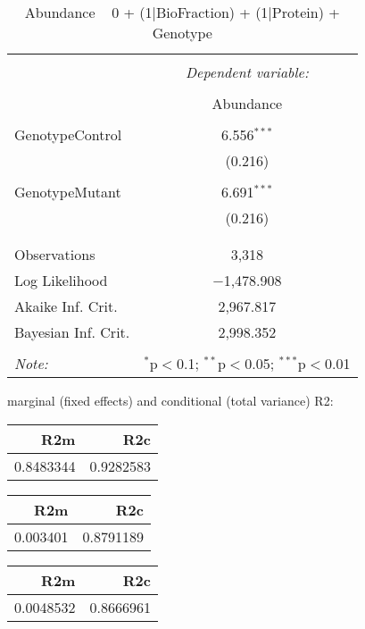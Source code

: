 \documentclass[11pt]{report}
\begin{document}
\begin{table}[!htbp] \centering 
  \caption{Abundance ~ 0 + (1|BioFraction) + (1|Protein) + Genotype} 
  \label{} 
\begin{tabular}{@{\extracolsep{5pt}}lc} 
\\[-1.8ex]\hline 
\hline \\[-1.8ex] 
 & \multicolumn{1}{c}{\textit{Dependent variable:}} \\ 
\cline{2-2} 
\\[-1.8ex] & Abundance \\ 
\hline \\[-1.8ex] 
 GenotypeControl & 6.556$^{***}$ \\ 
  & (0.216) \\ 
  & \\ 
 GenotypeMutant & 6.691$^{***}$ \\ 
  & (0.216) \\ 
  & \\ 
\hline \\[-1.8ex] 
Observations & 3,318 \\ 
Log Likelihood & $-$1,478.908 \\ 
Akaike Inf. Crit. & 2,967.817 \\ 
Bayesian Inf. Crit. & 2,998.352 \\ 
\hline 
\hline \\[-1.8ex] 
\textit{Note:}  & \multicolumn{1}{r}{$^{*}$p$<$0.1; $^{**}$p$<$0.05; $^{***}$p$<$0.01} \\ 
\end{tabular} 
\end{table} 
marginal (fixed effects) and conditional (total variance) R2:

\begin{tabular}{r|r}
\hline
R2m & R2c\\
\hline
0.8483344 & 0.9282583\\
\hline
\end{tabular}

\begin{tabular}{r|r}
\hline
R2m & R2c\\
\hline
0.003401 & 0.8791189\\
\hline
\end{tabular}

\begin{tabular}{r|r}
\hline
R2m & R2c\\
\hline
0.0048532 & 0.8666961\\
\hline
\end{tabular}
\end{document}
